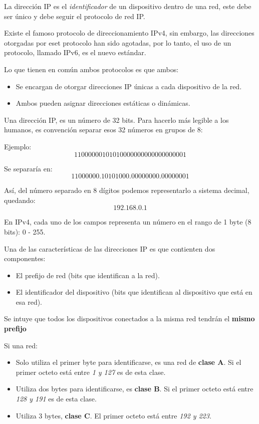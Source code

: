 \documentclass[11pt]{article}
\author{Diego Domínguez}
\date{\today}
\title{}
\begin{document}
La dirección IP es el \emph{identificador} de un
dispositivo dentro de una red, este debe ser único
y debe seguir el protocolo de red IP.

Existe el famoso protocolo de direccionamiento
IPv4, sin embargo, las direcciones otorgadas por
eset protocolo han sido agotadas, por lo tanto, el
uso de un protocolo, llamado IPv6, es el nuevo
estándar.

Lo que tienen en común ambos protocolos es que
ambos:
\begin{itemize}
\item Se encargan de otorgar direcciones IP únicas a
cada dispositivo de la red.
\item Ambos pueden asignar direcciones estáticas o
dinámicas.
\end{itemize}

Una dirección IP, es un número de 32 bits.
Para hacerlo más legible a los humanos, es
convención separar esos 32 números en grupos de 8:

Ejemplo: $$11000000101010000000000000000001$$

Se separaría en: $$11000000.10101000.00000000.00000001$$

Así, del número separado en 8 dígitos podemos
representarlo a sistema decimal, quedando: $$192.168.0.1$$


En IPv4, cada uno de los campos representa un
número en el rango de 1 byte (8 bits): 0 - 255.

Una de las características de las direcciones IP
es que contienten dos componentes:
\begin{itemize}
\item El prefijo de red (bits que identifican a la
red).
\item El identificador del dispositivo (bits que
identifican al dispositivo que está en esa red).
\end{itemize}

Se intuye que todos los dispositivos conectados a
la misma red tendrán el \textbf{mismo prefijo}

Si una red:
\begin{itemize}
\item Solo utiliza el primer byte para identificarse,
es una red de \textbf{clase A}. Si el primer octeto
está entre \emph{1 y 127} es de esta clase.
\item Utiliza dos bytes para identificarse, es \textbf{clase
B}. Si el primer octeto está entre \emph{128 y 191} es de
esta clase.
\item Utiliza 3 bytes, \textbf{clase C}. El primer octeto
está entre \emph{192 y 223}.
\end{itemize}
\end{document}
